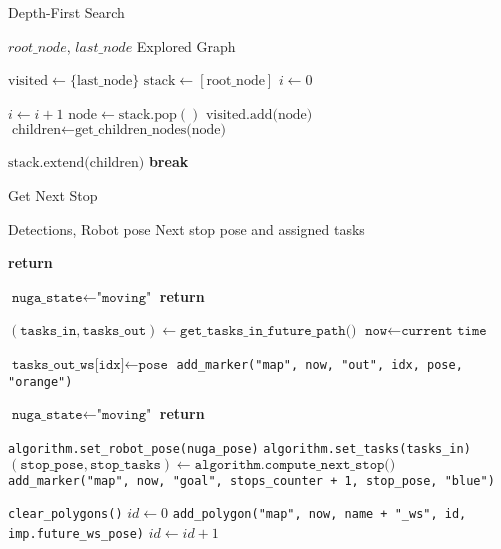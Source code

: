 \begin{algorithm}[H]
  \caption{Depth-First Search}
  \label{alg:dfs}
  \begin{algorithmic}[1]
    \REQUIRE $root\_node$, $last\_node$
    \ENSURE Explored Graph

    \STATE $\text{visited} \gets \{\text{last\_node}\}$ 
    \STATE $\text{stack} \gets [\text{root\_node}]$ 
    \STATE $i \gets 0$ 

    \STATE $i \gets i + 1$
    \STATE $\text{node} \gets \text{stack.pop}()$
    \STATE $\text{visited.add(node)}$
    \STATE $\text{children} \gets \text{get\_children\_nodes(node)}$

    \STATE $\text{stack.extend(children)}$ 
    \ENDIF
    \ENDIF
    \STATE \textbf{break} 
    \ENDIF
    \ENDWHILE
  \end{algorithmic}
\end{algorithm}

\begin{algorithm}[H]
  \caption{Get Next Stop}
  \label{alg:get-next-stop}
  \begin{algorithmic}[1]
    \REQUIRE Detections, Robot pose
    \ENSURE Next stop pose and assigned tasks

    \STATE \textbf{return}
    \ENDIF

    \STATE $\texttt{nuga\_state} \gets \texttt{"moving"}$
    \STATE \textbf{return}
    \ENDIF

    \STATE $(\texttt{tasks\_in}, \texttt{tasks\_out}) \gets \texttt{get\_tasks\_in\_future\_path()}$
    \STATE $\texttt{now} \gets \texttt{current time}$

    \STATE $\texttt{tasks\_out\_ws[idx]} \gets \texttt{pose}$
    \STATE \texttt{add\_marker("map", now, "out", idx, pose, "orange")}
    \ENDFOR
    \ENDIF

    \STATE $\texttt{nuga\_state} \gets \texttt{"moving"}$
    \STATE \textbf{return}
    \ENDIF

    \STATE \texttt{algorithm.set\_robot\_pose(nuga\_pose)}
    \STATE \texttt{algorithm.set\_tasks(tasks\_in)}
    \STATE $(\texttt{stop\_pose}, \texttt{stop\_tasks}) \gets \texttt{algorithm.compute\_next\_stop()}$
    \STATE \texttt{add\_marker("map", now, "goal", stops\_counter + 1, stop\_pose, "blue")}

    \STATE \texttt{clear\_polygons()}
    \STATE $id \gets 0$
    \STATE \texttt{add\_polygon("map", now, name + "\_ws", id, imp.future\_ws\_pose)}
    \STATE $id \gets id + 1$
    \ENDFOR
  \end{algorithmic}
\end{algorithm}


